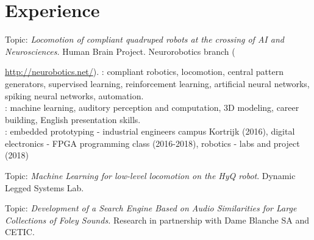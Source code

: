 \documentclass[a4paper]{deedy-resume} %
\begin{document}
\section{Experience}
\vspace{5pt}
Topic: \textit{Locomotion of compliant quadruped robots at the crossing of AI and Neurosciences.} Human Brain Project. Neurorobotics branch ({\url{http://neurobotics.net/}). : compliant robotics, locomotion, central pattern generators, supervised learning, reinforcement learning, artificial neural networks, spiking neural networks, automation. \\
: machine learning, auditory perception and computation, 3D modeling, career building, English presentation skills. \\
: embedded prototyping - industrial engineers campus Kortrijk (2016), digital electronics - FPGA programming class (2016-2018), robotics - labs and project (2018)
\vspace{9pt}


Topic: \textit{Machine Learning for low-level locomotion on the HyQ robot}. Dynamic Legged Systems Lab.

\vspace{9pt}

Topic: \textit{Development of a Search Engine Based on Audio Similarities for Large Collections of Foley Sounds.} Research in partnership with Dame Blanche SA and CETIC.

\vspace{9pt}


}
\end{document}
